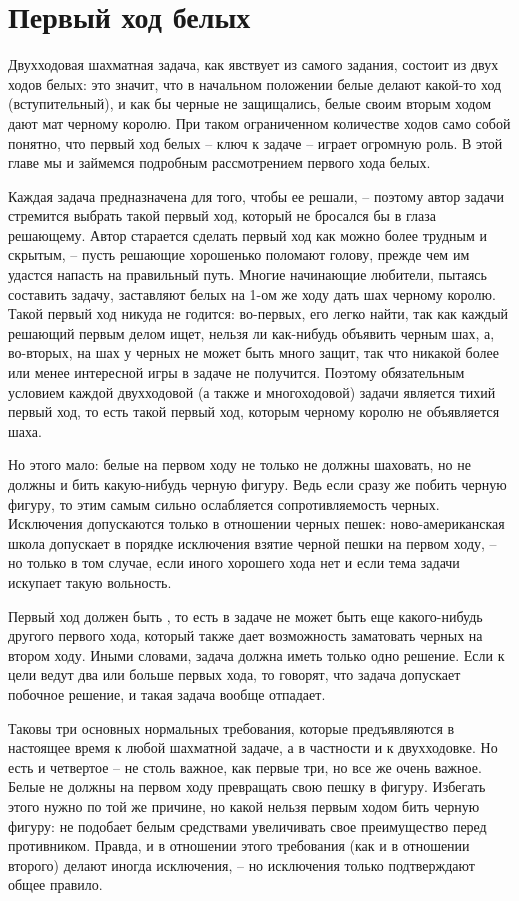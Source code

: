 \chapter{Первый ход белых}

Двухходовая шахматная задача, как явствует из самого задания, состоит из двух ходов белых: это значит, что в начальном положении белые делают какой-то ход (вступительный), и как бы черные не защищались, белые своим вторым ходом дают мат черному королю. При таком ограниченном количестве ходов само собой понятно, что первый ход белых -- ключ к задаче -- играет огромную роль. В этой главе мы и займемся подробным рассмотрением первого хода белых.

Каждая задача предназначена для того, чтобы ее решали, -- поэтому автор задачи стремится выбрать такой первый ход, который не бросался бы в глаза решающему. Автор старается сделать первый ход как можно более трудным и скрытым, -- пусть решающие хорошенько поломают голову, прежде чем им удастся напасть на правильный путь.
Многие начинающие любители, пытаясь составить задачу, заставляют белых на 1-ом же ходу дать шах черному королю. Такой первый ход никуда не годится: во-первых, его легко найти, так как каждый решающий первым делом ищет, нельзя ли как-нибудь объявить черным шах, а, во-вторых, на шах у черных не может быть много защит, так что никакой более или менее интересной игры в задаче не получится. Поэтому обязательным условием каждой двухходовой (а также и многоходовой) задачи является тихий первый ход, то есть такой первый ход, которым черному королю не объявляется шаха.

Но этого мало: белые на первом ходу не только не должны шаховать, но не должны и бить какую-нибудь черную фигуру. Ведь если сразу же побить черную фигуру, то этим самым сильно ослабляется сопротивляемость черных. Исключения допускаются только в отношении черных пешек: ново-американская школа допускает в порядке исключения взятие черной пешки на первом ходу, -- но только в том случае, если иного хорошего хода нет и если тема задачи искупает такую вольность.

Первый ход должен быть , то есть в задаче не может быть еще какого-нибудь другого первого хода, который также дает возможность заматовать черных на втором ходу. Иными словами, задача должна иметь только одно решение. Если к цели ведут два или больше первых хода, то говорят, что задача допускает побочное решение, и такая задача вообще отпадает.

Таковы три основных нормальных требования, которые предъявляются в настоящее время к любой шахматной задаче, а в частности и к двухходовке. Но есть и четвертое -- не столь важное, как первые три, но все же очень важное. Белые не должны на первом ходу превращать свою пешку в фигуру. Избегать этого нужно по той же причине, но какой нельзя первым ходом бить черную фигуру: не подобает белым  средствами увеличивать свое преимущество перед противником. Правда, и в отношении этого требования (как и в отношении второго) делают иногда исключения, -- но исключения только подтверждают общее правило.

